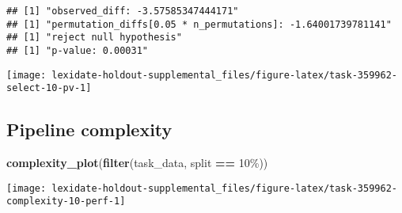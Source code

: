 \documentclass[
]{book}
\newenvironment{Shaded}{\begin{snugshade}}{\end{snugshade}}
\newcommand{\AttributeTok}[1]{\textcolor[rgb]{0.13,0.29,0.53}{#1}}
\newcommand{\DecValTok}[1]{\textcolor[rgb]{0.00,0.00,0.81}{#1}}
\newcommand{\FunctionTok}[1]{\textcolor[rgb]{0.13,0.29,0.53}{\textbf{#1}}}
\newcommand{\NormalTok}[1]{#1}
\newcommand{\OtherTok}[1]{\textcolor[rgb]{0.56,0.35,0.01}{#1}}
\newcommand{\SpecialCharTok}[1]{\textcolor[rgb]{0.81,0.36,0.00}{\textbf{#1}}}
\newcommand{\StringTok}[1]{\textcolor[rgb]{0.31,0.60,0.02}{#1}}
\begin{document}
\begin{Shaded}
\end{Shaded}

\begin{verbatim}
## [1] "observed_diff: -3.57585347444171"
## [1] "permutation_diffs[0.05 * n_permutations]: -1.64001739781141"
## [1] "reject null hypothesis"
## [1] "p-value: 0.00031"
\end{verbatim}

\texttt{[image: lexidate-holdout-supplemental\_files/figure-latex/task-359962-select-10-pv-1]}

\hypertarget{pipeline-complexity-49}{%
\subsection{Pipeline complexity}\label{pipeline-complexity-49}}

\begin{Shaded}
\begin{Highlighting}[]
\FunctionTok{complexity\_plot}\NormalTok{(}\FunctionTok{filter}\NormalTok{(task\_data, split }\SpecialCharTok{==} \StringTok{\textquotesingle{}10\%\textquotesingle{}}\NormalTok{))}
\end{Highlighting}
\end{Shaded}

\texttt{[image: lexidate-holdout-supplemental\_files/figure-latex/task-359962-complexity-10-perf-1]}
\end{document}
